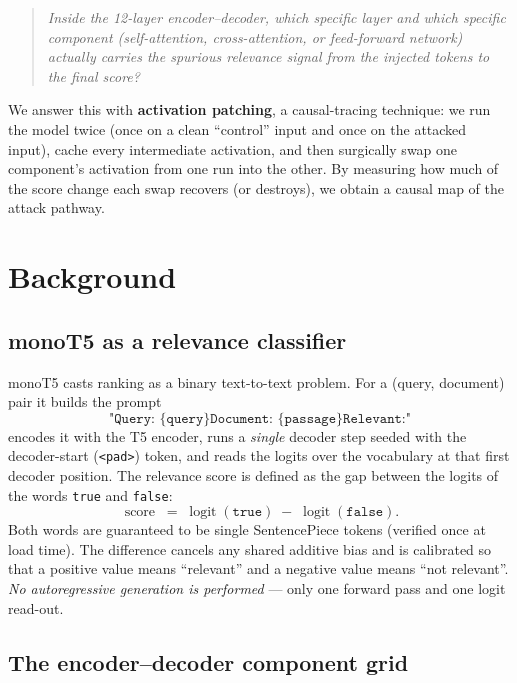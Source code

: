 \documentclass[11pt]{article}
\newcommand{\score}{\operatorname{score}}
\begin{document}
\begin{quote}
\itshape Inside the 12-layer encoder--decoder, which specific layer and which
specific component (self-attention, cross-attention, or feed-forward network)
actually carries the spurious relevance signal from the injected tokens to the
final score?
\end{quote}

We answer this with \textbf{activation patching}, a causal-tracing technique:
we run the model twice (once on a clean ``control'' input and once on the
attacked input), cache every intermediate activation, and then surgically swap
one component's activation from one run into the other. By measuring how much
of the score change each swap recovers (or destroys), we obtain a causal map of
the attack pathway.

\section{Background}

\subsection{monoT5 as a relevance classifier}

monoT5 casts ranking as a binary text-to-text problem. For a (query, document)
pair it builds the prompt
\[
\texttt{"Query: \{query\} Document: \{passage\} Relevant:"}
\]
encodes it with the T5 encoder, runs a \emph{single} decoder step seeded with the
decoder-start (\texttt{<pad>}) token, and reads the logits over the vocabulary at
that first decoder position. The relevance score is defined as the gap between
the logits of the words \texttt{true} and \texttt{false}:
\begin{equation}
\score \;=\; \operatorname{logit}(\texttt{true}) \;-\; \operatorname{logit}(\texttt{false}).
\label{eq:score}
\end{equation}
Both words are guaranteed to be single SentencePiece tokens (verified once at
load time). The difference cancels any shared additive bias and is calibrated so
that a positive value means ``relevant'' and a negative value means ``not
relevant''. \emph{No autoregressive generation is performed} — only one forward
pass and one logit read-out.

\subsection{The encoder--decoder component grid}
\end{document}
